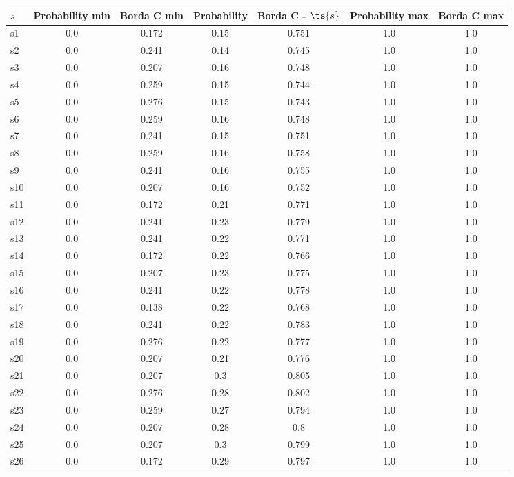\documentclass{article}
\begin{document}
\noindent\begin{tabular}{|l|c|c|c|c|c|c|}
\hline
$s$& Probability min & Borda C min & Probability & Borda C - $\ts{s}$ & Probability max & Borda C max\\
\hline
s1 &0.0 & 0.172 & 0.15 & 0.751 & 1.0 & 1.0\\
\hline
s2 &0.0 & 0.241 & 0.14 & 0.745 & 1.0 & 1.0\\
\hline
s3 &0.0 & 0.207 & 0.16 & 0.748 & 1.0 & 1.0\\
\hline
s4 &0.0 & 0.259 & 0.15 & 0.744 & 1.0 & 1.0\\
\hline
s5 &0.0 & 0.276 & 0.15 & 0.743 & 1.0 & 1.0\\
\hline
s6 &0.0 & 0.259 & 0.16 & 0.748 & 1.0 & 1.0\\
\hline
s7 &0.0 & 0.241 & 0.15 & 0.751 & 1.0 & 1.0\\
\hline
s8 &0.0 & 0.259 & 0.16 & 0.758 & 1.0 & 1.0\\
\hline
s9 &0.0 & 0.241 & 0.16 & 0.755 & 1.0 & 1.0\\
\hline
s10 &0.0 & 0.207 & 0.16 & 0.752 & 1.0 & 1.0\\
\hline
s11 &0.0 & 0.172 & 0.21 & 0.771 & 1.0 & 1.0\\
\hline
s12 &0.0 & 0.241 & 0.23 & 0.779 & 1.0 & 1.0\\
\hline
s13 &0.0 & 0.241 & 0.22 & 0.771 & 1.0 & 1.0\\
\hline
s14 &0.0 & 0.172 & 0.22 & 0.766 & 1.0 & 1.0\\
\hline
s15 &0.0 & 0.207 & 0.23 & 0.775 & 1.0 & 1.0\\
\hline
s16 &0.0 & 0.241 & 0.22 & 0.778 & 1.0 & 1.0\\
\hline
s17 &0.0 & 0.138 & 0.22 & 0.768 & 1.0 & 1.0\\
\hline
s18 &0.0 & 0.241 & 0.22 & 0.783 & 1.0 & 1.0\\
\hline
s19 &0.0 & 0.276 & 0.22 & 0.777 & 1.0 & 1.0\\
\hline
s20 &0.0 & 0.207 & 0.21 & 0.776 & 1.0 & 1.0\\
\hline
s21 &0.0 & 0.207 & 0.3 & 0.805 & 1.0 & 1.0\\
\hline
s22 &0.0 & 0.276 & 0.28 & 0.802 & 1.0 & 1.0\\
\hline
s23 &0.0 & 0.259 & 0.27 & 0.794 & 1.0 & 1.0\\
\hline
s24 &0.0 & 0.207 & 0.28 & 0.8 & 1.0 & 1.0\\
\hline
s25 &0.0 & 0.207 & 0.3 & 0.799 & 1.0 & 1.0\\
\hline
s26 &0.0 & 0.172 & 0.29 & 0.797 & 1.0 & 1.0\\

\end{tabular}
\end{document}
